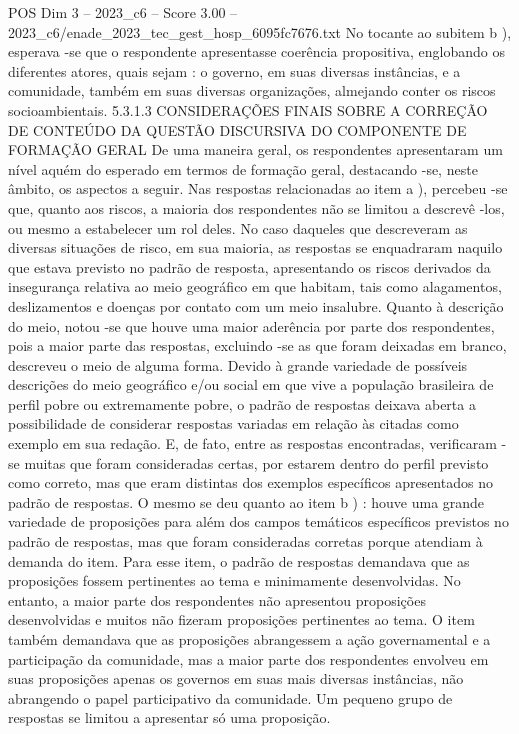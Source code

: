 \begin{textsample}{POS Dim 3 – 2023\_c6 – Score 3.00 – 2023\_c6/enade\_2023\_tec\_gest\_hosp\_6095fc7676.txt}
No tocante ao subitem b ), esperava -se que o respondente apresentasse coerência propositiva, englobando os diferentes atores, quais sejam : o governo, em suas diversas instâncias, e a comunidade, também em suas diversas organizações, almejando conter os riscos socioambientais. 5.3.1.3 CONSIDERAÇÕES FINAIS SOBRE A CORREÇÃO DE CONTEÚDO DA QUESTÃO DISCURSIVA DO COMPONENTE DE FORMAÇÃO GERAL De uma maneira geral, os respondentes apresentaram um nível aquém do esperado em termos de formação geral, destacando -se, neste âmbito, os aspectos a seguir.
Nas respostas relacionadas ao item a ), percebeu -se que, quanto aos riscos, a maioria dos respondentes não se limitou a descrevê -los, ou mesmo a estabelecer um rol deles.
No caso daqueles que descreveram as diversas situações de risco, em sua maioria, as respostas se enquadraram naquilo que estava previsto no padrão de resposta, apresentando os riscos derivados da insegurança relativa ao meio geográfico em que habitam, tais como alagamentos, deslizamentos e doenças por contato com um meio insalubre.
Quanto à descrição do meio, notou -se que houve uma maior aderência por parte dos respondentes, pois a maior parte das respostas, excluindo -se as que foram deixadas em branco, descreveu o meio de alguma forma.
Devido à grande variedade de possíveis descrições do meio geográfico e/ou social em que vive a população brasileira de perfil pobre ou extremamente pobre, o padrão de respostas deixava aberta a possibilidade de considerar respostas variadas em relação às citadas como exemplo em sua redação.
E, de fato, entre as respostas encontradas, verificaram -se muitas que foram consideradas certas, por estarem dentro do perfil previsto como correto, mas que eram distintas dos exemplos específicos apresentados no padrão de respostas.
O mesmo se deu quanto ao item b ) : houve uma grande variedade de proposições para além dos campos temáticos específicos previstos no padrão de respostas, mas que foram consideradas corretas porque atendiam à demanda do item.
Para esse item, o padrão de respostas demandava que as proposições fossem pertinentes ao tema e minimamente desenvolvidas.
No entanto, a maior parte dos respondentes não apresentou proposições desenvolvidas e muitos não fizeram proposições pertinentes ao tema.
O item também demandava que as proposições abrangessem a ação governamental e a participação da comunidade, mas a maior parte dos respondentes envolveu em suas proposições apenas os governos em suas mais diversas instâncias, não abrangendo o papel participativo da comunidade.
Um pequeno grupo de respostas se limitou a apresentar só uma proposição.

\end{textsample}
